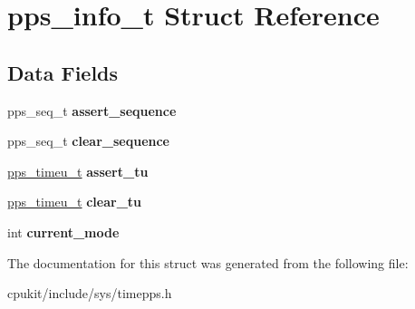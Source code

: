 \hypertarget{structpps__info__t}{}\section{pps\+\_\+info\+\_\+t Struct Reference}
\label{structpps__info__t}
\subsection*{Data Fields}
\begin{DoxyCompactItemize}
\item 
\mbox{\label{structpps__info__t_a63d8cc562e66cfedbe6636247d092311}} 
pps\+\_\+seq\+\_\+t {\bfseries assert\+\_\+sequence}
\item 
\mbox{\label{structpps__info__t_ac4fa3e103ba3acc6fffef52bb37dab5d}} 
pps\+\_\+seq\+\_\+t {\bfseries clear\+\_\+sequence}
\item 
\mbox{\label{structpps__info__t_a51f5c15de12d601780596186ee06e8d5}} 
\mbox{\hyperlink{unionpps__timeu}{pps\+\_\+timeu\+\_\+t}} {\bfseries assert\+\_\+tu}
\item 
\mbox{\label{structpps__info__t_a558bce5f7cc76b38745b2b74bb5f424d}} 
\mbox{\hyperlink{unionpps__timeu}{pps\+\_\+timeu\+\_\+t}} {\bfseries clear\+\_\+tu}
\item 
\mbox{\label{structpps__info__t_a13889b34e29c1bd67e48e845d49549bf}} 
int {\bfseries current\+\_\+mode}
\end{DoxyCompactItemize}


The documentation for this struct was generated from the following file\+:\begin{DoxyCompactItemize}
\item 
cpukit/include/sys/timepps.\+h\end{DoxyCompactItemize}
